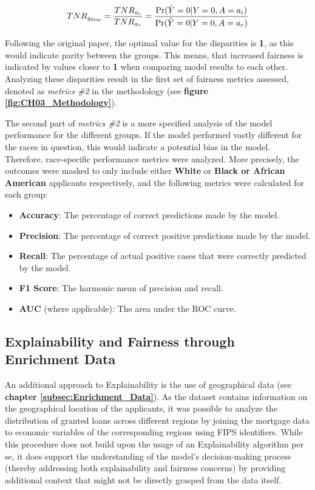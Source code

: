 \begin{equation}
    TNR_{g_{\text{disp}}} = \frac{TNR_{a_i}}{TNR_{a_r}} = \frac{\Pr(\hat{Y}=0 | Y=0, A=a_i)}{\Pr(\hat{Y}=0 | Y=0, A=a_r)}
    \label{eq:TNR_Disparity}
    \addcontentsline{frm}{formulas}{\protect\numberline{\theequation}\hspace{1em}TNR Disparity}
\end{equation}

Following the original paper, the optimal value for the disparities is \textbf{1}, as this would indicate parity between the groups. This means, that increased fairness is indicated by values closer to \textbf{1} when comparing model results to each other.
Analyzing these disparities result in the first set of fairness metrics assessed, denoted as \textit{metrics \#2} in the methodology (see \textbf{figure \ref{fig:CH03_Methodology}}).

The second part of \textit{metrics \#2} is a more specified analysis of the model performance for the different groups. If the model performed vastly different for the races in question, this would indicate a potential bias in the model. Therefore, race-specific performance metrics were analyzed.
More precisely, the outcomes were masked to only include either \textbf{White} or \textbf{Black or African American} applicants respectively, and the following metrics were calculated for each group:
\begin{itemize}
    \item \textbf{Accuracy}: The percentage of correct predictions made by the model.
    \item \textbf{Precision}: The percentage of correct positive predictions made by the model.
    \item \textbf{Recall}: The percentage of actual positive cases that were correctly predicted by the model.
    \item \textbf{F1 Score}: The harmonic mean of precision and recall.
    \item \textbf{AUC} (where applicable): The area under the ROC curve.
\end{itemize}

\subsection{Explainability and Fairness through Enrichment Data}\label{subsec:Enrichment_Data_Methodology}

An additional approach to Explainability is the use of geographical data (see \textbf{chapter \ref{subsec:Enrichment_Data}}). As the dataset contains information on the geographical location of the applicants, it was possible to analyze the distribution of granted loans across different regions by joining the mortgage data to economic variables of the corresponding regions using FIPS identifiers. 
While this procedure does not build upon the usage of an Explainability algorithm per se, it does support the understanding of the model's decision-making process (thereby addressing both explainability and fairness concerns) by providing additional context that might not be directly grasped from the data itself.

